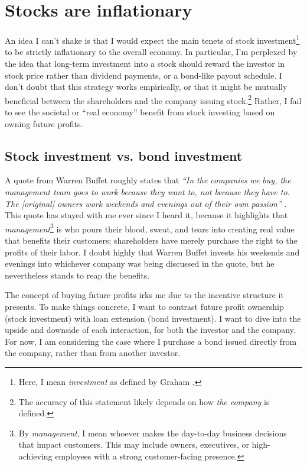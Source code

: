 \section{Stocks are inflationary}

An idea I can't shake is that I would expect the main tenets of stock investment\footnote{Here, I mean {\it investment} as defined by Graham \cite{Graham2024}.} to be strictly inflationary to the overall economy.  In particular, I'm perplexed by the idea that long-term investment into a stock should reward the investor in stock price rather than dividend payments, or a bond-like payout schedule.  I don't doubt that this strategy works empirically, or that it might be mutually beneficial between the shareholders and the company issuing stock.\footnote{The accuracy of this statement likely depends on how {\it the company} is defined.}  Rather, I fail to see the societal or ``real economy'' benefit from stock investing based on owning future profits.

\subsection{Stock investment vs. bond investment}

A quote from Warren Buffet roughly states that {\it ``In the companies we buy, the management team goes to work because they want to, not because they have to.  The [original] owners work weekends and evenings out of their own passion''} .  This quote has stayed with me ever since I heard it, because it highlights that {\it management}\footnote{By {\it management}, I mean whoever makes the day-to-day business decisions that impact customers.  This may include owners, executives, or high-achieving employees with a strong customer-facing presence.} is who pours their blood, sweat, and tears into creating real value that benefits their customers; shareholders have merely purchase the right to the profits of their labor.  I doubt highly that Warren Buffet invests his weekends and evenings into whichever company was being discussed in the quote, but he nevertheless stands to reap the benefits.

The concept of buying future profits irks me due to the incentive structure it presents.  To make things concrete, I want to contrast future profit ownership (stock investment) with loan extension (bond investment).  I want to dive into the upside and downside of each interaction, for both the investor and the company.  For now, I am considering the case where I purchase a bond issued directly from the company, rather than from another investor.

